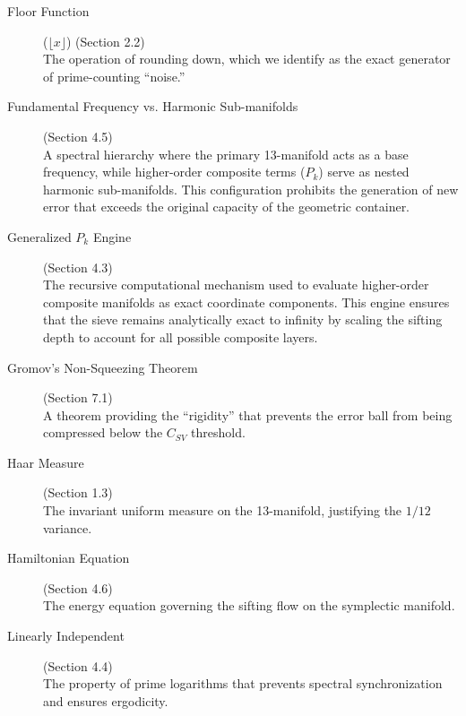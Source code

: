 \documentclass[sn-mathphys-num, pdflatex, referee]{sn-jnl}
\begin{document}
\begin{description}
    \item[Floor Function] \hypertarget{floor_function}{}\label{gloss:floor} ($\lfloor x \rfloor$) (Section 2.2) \hfill \\
    The operation of rounding down, which we identify as the exact generator of prime-counting ``noise.''

    \item[Fundamental Frequency vs. Harmonic Sub-manifolds] \hypertarget{harmonic-hum}{}\label{gloss:harmonic-hum} (Section 4.5) \hfill \\
    A spectral hierarchy where the primary 13-manifold acts as a base frequency, while higher-order composite terms ($P_k$) serve as nested harmonic sub-manifolds. This configuration prohibits the generation of new error that exceeds the original capacity of the geometric container.
    
    \item[Generalized $P_k$ Engine] \hypertarget{pk-engine}{}\label{gloss:pk-engine} (Section 4.3) \hfill \\
    The recursive computational mechanism used to evaluate higher-order composite manifolds as exact coordinate components. This engine ensures that the sieve remains analytically exact to infinity by scaling the sifting depth to account for all possible composite layers.

    \item[Gromov's Non-Squeezing Theorem] \hypertarget{gromov}{}\label{gloss:gromov} (Section 7.1) \hfill \\
    A theorem providing the ``rigidity'' that prevents the error ball from being compressed below the $C_{SV}$ threshold.

    \item[Haar Measure] \hypertarget{haar}{}\label{gloss:haar} (Section 1.3) \hfill \\
    The invariant uniform measure on the 13-manifold, justifying the $1/12$ variance.

    \item[Hamiltonian Equation] \hypertarget{hamiltonian}{}\label{gloss:hamiltonian} (Section 4.6) \hfill \\
    The energy equation governing the sifting flow on the symplectic manifold.

    \item[Linearly Independent] \hypertarget{linear}{}\label{gloss:linear} (Section 4.4) \hfill \\
    The property of prime logarithms that prevents spectral synchronization and ensures ergodicity.


\end{description}
\end{document}
